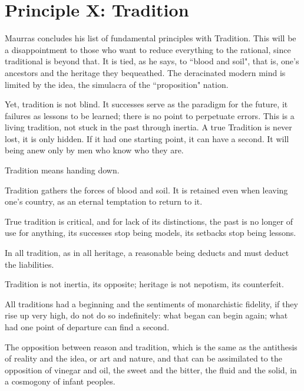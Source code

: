 \section{Principle X: Tradition}

\begin{quotex}
Maurras concludes his list of fundamental principles with Tradition. This will be a disappointment to those who want to reduce everything to the rational, since traditional is beyond that. It is tied, as he says, to ``blood and soil", that is, one's ancestors and the heritage they bequeathed. The deracinated modern mind is limited by the idea, the simulacra of the ``proposition" nation.

Yet, tradition is not blind. It successes serve as the paradigm for the future, it failures as lessons to be learned; there is no point to perpetuate errors. This is a living tradition, not stuck in the past through inertia. A true Tradition is never lost, it is only hidden. If it had one starting point, it can have a second. It will being anew only by men who know who they are. 

\end{quotex}
Tradition means handing down.

Tradition gathers the forces of blood and soil. It is retained even when leaving one's country, as an eternal temptation to return to it.

True tradition is critical, and for lack of its distinctions, the past is no longer of use for anything, its successes stop being models, its setbacks stop being lessons.

In all tradition, as in all heritage, a reasonable being deducts and must deduct the liabilities.

Tradition is not inertia, its opposite; heritage is not nepotism, its counterfeit.

All traditions had a beginning and the sentiments of monarchistic fidelity, if they rise up very high, do not do so indefinitely: what began can begin again; what had one point of departure can find a second.

The opposition between reason and tradition, which is the same as the antithesis of reality and the idea, or art and nature, and that can be assimilated to the opposition of vinegar and oil, the sweet and the bitter, the fluid and the solid, in a cosmogony of infant peoples.




